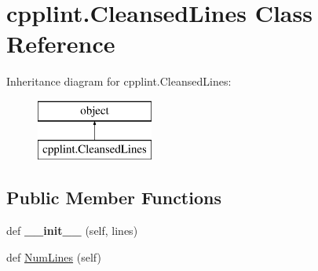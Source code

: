 \hypertarget{classcpplint_1_1CleansedLines}{}\section{cpplint.\+Cleansed\+Lines Class Reference}
\label{classcpplint_1_1CleansedLines}
Inheritance diagram for cpplint.\+Cleansed\+Lines\+:\begin{figure}[H]
\begin{center}
\leavevmode
\includegraphics[height=2.000000cm]{classcpplint_1_1CleansedLines}
\end{center}
\end{figure}
\subsection*{Public Member Functions}
\begin{DoxyCompactItemize}
\item 
def {\bfseries \+\_\+\+\_\+init\+\_\+\+\_\+} (self, lines)\hypertarget{classcpplint_1_1CleansedLines_ad2bc06d9697e2bbfbc7e6b50878c8c8f}{}\label{classcpplint_1_1CleansedLines_ad2bc06d9697e2bbfbc7e6b50878c8c8f}

\item 
def \hyperlink{classcpplint_1_1CleansedLines_a26a7eff70493d64d58d16f4a406c7ee9}{Num\+Lines} (self)
\end{DoxyCompactItemize}
